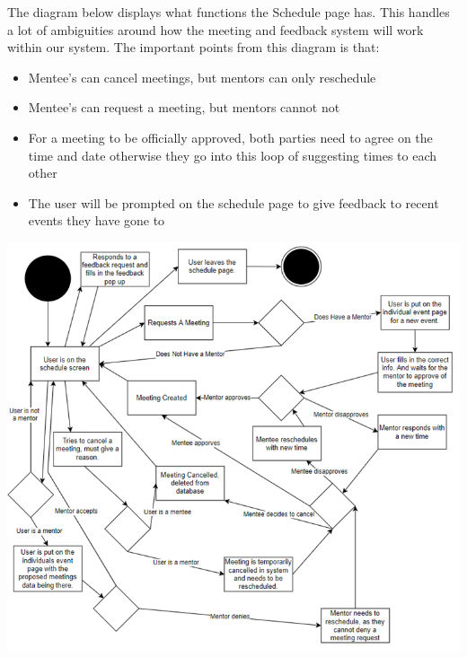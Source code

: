 \documentclass[10pt]{article}
\begin{document}
The diagram below displays what functions the Schedule page has. This handles a
lot of ambiguities around how the meeting and feedback system will work within
our system. The important points from this diagram is that:
\begin{itemize}
    \item Mentee’s can cancel meetings, but mentors can only reschedule
    \item Mentee’s can request a meeting, but mentors cannot not
    \item For a meeting to be officially approved, both parties need to agree on the time and date otherwise they go into this loop of suggesting times to each other
    \item The user will be prompted on the schedule page to give feedback to recent events they have gone to
\end{itemize}
\includegraphics[scale=0.7]{Meeting}
\end{document}
